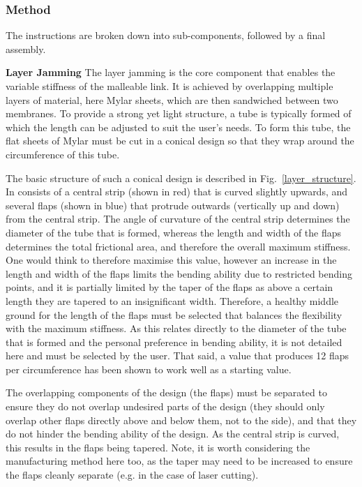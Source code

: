 \subsubsection{Method}
The instructions are broken down into sub-components, followed by a final assembly.

\textbf{Layer Jamming}
The layer jamming is the core component that enables the variable stiffness of the malleable link. It is achieved by overlapping multiple layers of material, here Mylar sheets, which are then sandwiched between two membranes. To provide a strong yet light structure, a tube is typically formed of which the length can be adjusted to suit the user’s needs. To form this tube, the flat sheets of Mylar must be cut in a conical design so that they wrap around the circumference of this tube.

The basic structure of such a conical design is described in Fig.~\ref{layer_structure}. In consists of a central strip (shown in red) that is curved slightly upwards, and several flaps (shown in blue) that protrude outwards (vertically up and down) from the central strip. The angle of curvature of the central strip determines the diameter of the tube that is formed, whereas the length and width of the flaps determines the total frictional area, and therefore the overall maximum stiffness. One would think to therefore maximise this value, however an increase in the length and width of the flaps limits the bending ability due to restricted bending points, and it is partially limited by the taper of the flaps as above a certain length they are tapered to an insignificant width. Therefore, a healthy middle ground for the length of the flaps must be selected that balances the flexibility with the maximum stiffness. As this relates directly to the diameter of the tube that is formed and the personal preference in bending ability, it is not detailed here and must be selected by the user. That said, a value that produces 12 flaps per circumference has been shown to work well as a starting value.

The overlapping components of the design (the flaps) must be separated to ensure they do not overlap undesired parts of the design (they should only overlap other flaps directly above and below them, not to the side), and that they do not hinder the bending ability of the design. As the central strip is curved, this results in the flaps being tapered. Note, it is worth considering the manufacturing method here too, as the taper may need to be increased to ensure the flaps cleanly separate (e.g. in the case of laser cutting).

